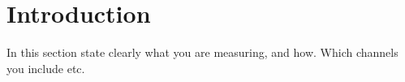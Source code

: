\section{Introduction}
In this section state clearly what you are measuring, 
and how. Which channels you include etc.